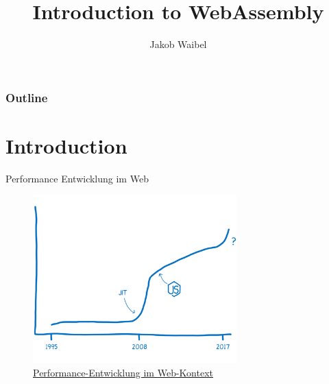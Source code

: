 \documentclass{beamer}
\title[WebAssembly]{Introduction to WebAssembly}
\author{Jakob Waibel}
\institute[Jakob Waibel]{Medieninformatik}
\date
\begin{document}
\begin{frame}
    \titlepage
\end{frame}

\begin{frame}
    \frametitle{Outline}
    \tableofcontents
\end{frame}

\section{Introduction}
\begin{frame}{Performance Entwicklung im Web}
    \begin{figure}
        \includegraphics[width=0.7\textwidth,height=0.7\textheight]{./images/perf_history.png}
        \caption{\href{https://hacks.mozilla.org/2017/02/a-cartoon-intro-to-webassembly/}{Performance-Entwicklung im Web-Kontext}}
    \end{figure}
\end{frame}
\end{document}
